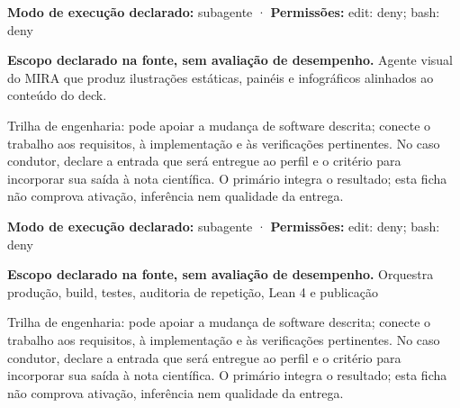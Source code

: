 \begin{arquitetura}
\textbf{Modo de execução declarado:} subagente · \textbf{Permissões:} edit: deny; bash: deny
\end{arquitetura}


\begin{descricao}
\textbf{Escopo declarado na fonte, sem avaliação de desempenho.}
Agente visual do MIRA que produz ilustrações estáticas, painéis e infográficos alinhados ao conteúdo do deck.
\end{descricao}

\begin{funcao}
Trilha de engenharia: pode apoiar a mudança de software descrita; conecte o trabalho aos requisitos, à implementação e às verificações pertinentes. No caso condutor, declare a entrada que será entregue ao perfil e o critério para incorporar sua saída à nota científica. O primário integra o resultado; esta ficha não comprova ativação, inferência nem qualidade da entrega.
\end{funcao}

\begin{arquitetura}
\textbf{Modo de execução declarado:} subagente · \textbf{Permissões:} edit: deny; bash: deny
\end{arquitetura}


\begin{descricao}
\textbf{Escopo declarado na fonte, sem avaliação de desempenho.}
Orquestra produção, build, testes, auditoria de repetição, Lean 4 e publicação
\end{descricao}

\begin{funcao}
Trilha de engenharia: pode apoiar a mudança de software descrita; conecte o trabalho aos requisitos, à implementação e às verificações pertinentes. No caso condutor, declare a entrada que será entregue ao perfil e o critério para incorporar sua saída à nota científica. O primário integra o resultado; esta ficha não comprova ativação, inferência nem qualidade da entrega.
\end{funcao}

